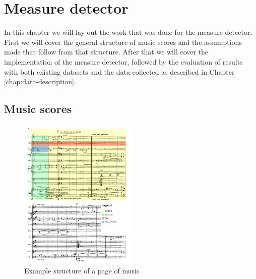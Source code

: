 \chapter{Measure detector}\label{chap:measure-detector}

In this chapter we will lay out the work that was done for the measure detector. First we will cover the general structure of music scores and the assumptions made that follow from that structure. After that we will cover the implementation of the measure detector, followed by the evaluation of results with both existing datasets and the data collected as described in Chapter \ref{chap:data-description}.

\section{Music scores}\label{sec:measure-detector-music-scores}

\begin{figure}
    \includegraphics[width=0.5\textwidth]{images/score-structure.png}
    \centering
    \caption{Example structure of a page of music}
    \label{fig:page-structure}
\end{figure}

